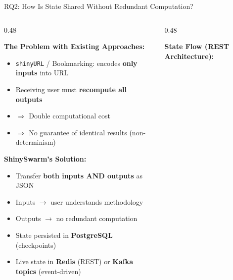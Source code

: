 \documentclass[aspectratio=169]{beamer}
\begin{document}
\begin{frame}{RQ2: How Is State Shared Without Redundant Computation?}

\begin{columns}[T]
\begin{column}{0.48\textwidth}

\textbf{The Problem with Existing Approaches:}

\vspace{0.3em}
\begin{itemize}
    \item \texttt{shinyURL} / Bookmarking: encodes \textbf{only inputs} into URL
    \item Receiving user must \textbf{recompute all outputs}
    \item $\Rightarrow$ Double computational cost
    \item $\Rightarrow$ No guarantee of identical results (non-determinism)
\end{itemize}

\vspace{0.5em}
\textbf{ShinySwarm's Solution:}
\begin{itemize}
    \item Transfer \textbf{both inputs AND outputs} as JSON
    \item Inputs $\rightarrow$ user understands methodology
    \item Outputs $\rightarrow$ no redundant computation
    \item State persisted in \textbf{PostgreSQL} (checkpoints)
    \item Live state in \textbf{Redis} (REST) or \textbf{Kafka topics} (event-driven)
\end{itemize}

\end{column}
\begin{column}{0.48\textwidth}

\textbf{State Flow (REST Architecture):}

\vspace{0.3em}
\end{column}
\end{columns}
\end{frame}
\end{document}
